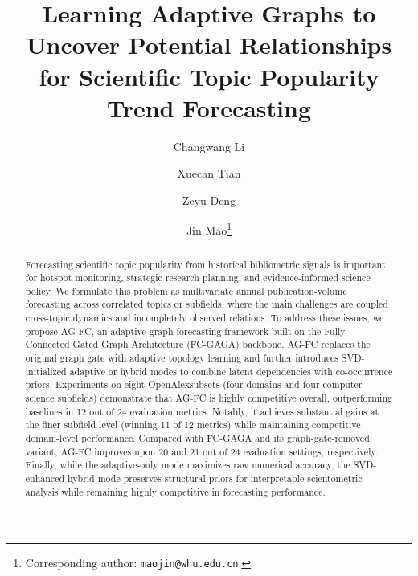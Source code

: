 \documentclass[runningheads]{llncs}
\newcommand{\OpenAlex}{\mbox{OpenAlex}}
\begin{document}
\title{Learning Adaptive Graphs to Uncover Potential Relationships for Scientific Topic Popularity Trend Forecasting}

\author{Changwang Li \and Xuecan Tian \and Zeyu Deng \and Jin Mao\thanks{Corresponding author: \texttt{maojin@whu.edu.cn}.}}


\maketitle

\begin{abstract}
Forecasting scientific topic popularity from historical bibliometric signals is important for hotspot monitoring, strategic research planning, and evidence-informed science policy. We formulate this problem as multivariate annual publication-volume forecasting across correlated topics or subfields, where the main challenges are coupled cross-topic dynamics and incompletely observed relations. To address these issues, we propose AG-FC, an adaptive graph forecasting framework built on the Fully Connected Gated Graph Architecture (FC-GAGA) backbone. AG-FC replaces the original graph gate with adaptive topology learning and further introduces SVD-initialized adaptive or hybrid modes to combine latent dependencies with co-occurrence priors. Experiments on eight \OpenAlex subsets (four domains and four computer-science subfields) demonstrate that AG-FC is highly competitive overall, outperforming baselines in 12 out of 24 evaluation metrics. Notably, it achieves substantial gains at the finer subfield level (winning 11 of 12 metrics) while maintaining competitive domain-level performance. Compared with FC-GAGA and its graph-gate-removed variant, AG-FC improves upon 20 and 21 out of 24 evaluation settings, respectively. Finally, while the adaptive-only mode maximizes raw numerical accuracy, the SVD-enhanced hybrid mode preserves structural priors for interpretable scientometric analysis while remaining highly competitive in forecasting performance.

\end{abstract}
\end{document}
